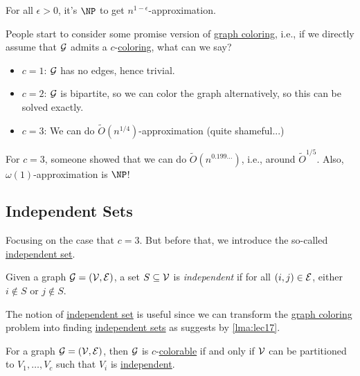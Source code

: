 \begin{theorem}
	For all \(\epsilon > 0\), it's \(\NP\) to get \(n^{1 - \epsilon }\)-approximation.
\end{theorem}

People start to consider some promise version of \hyperref[prb:graph-coloring]{graph coloring}, i.e., if we directly assume that \(\mathcal{\MakeUppercase{g}} \) admits a \(c\)-\hyperref[def:coloring]{coloring}, what can we say?
\begin{itemize}
	\item \(c = 1\): \(\mathcal{\MakeUppercase{g}} \) has no edges, hence trivial.
	\item \(c = 2\): \(\mathcal{\MakeUppercase{g}} \) is bipartite, so we can color the graph alternatively, so this can be solved exactly.
	\item \(c = 3\): We can do \(\widetilde{O} (n^{1 / 4})\)-approximation (quite shameful...)
\end{itemize}
\begin{remark}[SOTA for \(c=3\)]
	For \(c = 3\), someone showed that we can do \(\widetilde{O} (n^{0.199\ldots  })\), i.e., around \(\widetilde{O} ^{1 / 5}\). Also, \(\omega (1)\)-approximation is \(\NP\)!
\end{remark}

\subsection{Independent Sets}
Focusing on the case that \(c=3\). But before that, we introduce the so-called \hyperref[def:independent-set]{independent set}.
\begin{definition}\label{def:independent-set}
	Given a graph \(\mathcal{\MakeUppercase{g}} =(\mathcal{\MakeUppercase{v}} , \mathcal{\MakeUppercase{e}} )\), a set \(S \subseteq \mathcal{\MakeUppercase{v}} \) is \emph{independent} if for all \((i, j)\in \mathcal{\MakeUppercase{e}} \), either \(i \notin S\) or \(j \notin S\).
\end{definition}

The notion of \hyperref[def:independent-set]{independent set} is useful since we can transform the \hyperref[prb:graph-coloring]{graph coloring} problem into finding \hyperref[def:independent-set]{independent sets} as suggests by \autoref{lma:lec17}.

\begin{lemma}\label{lma:lec17}
	For a graph \(\mathcal{\MakeUppercase{g}} = (\mathcal{\MakeUppercase{v}} , \mathcal{\MakeUppercase{e}} )\), then \(\mathcal{\MakeUppercase{g}} \) is \(c\)-\hyperref[def:coloring]{colorable} if and only if \(\mathcal{\MakeUppercase{v}} \) can be partitioned to \(V_1, \ldots, V_c\) such that \(V_i\) is \hyperref[def:independent-set]{independent}.
\end{lemma}

